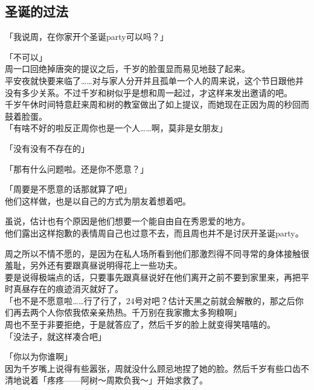 \subsection{圣诞的过法}

「我说周，在你家开个圣诞party可以吗？」

「不可以」\\

周一口回绝掉唐突的提议之后，千岁的脸蛋显而易见地鼓了起来。\\

平安夜就快要来临了……对与家人分开并且孤单一个人的周来说，这个节日跟他并没有多少关系。不过千岁和树似乎是想和周一起过，才这样来发出邀请的吧。\\

千岁午休时间特意赶来周和树的教室做出了如上提议，而她现在正因为周的秒回而鼓着脸蛋。\\

「有啥不好的啦反正周你也是一个人……啊，莫非是女朋友」

「没有没有不存在的」

「那有什么问题啦。还是你不愿意？」

「周要是不愿意的话那就算了吧」\\

他们这样做，也是以自己的方式为朋友着想着吧。

虽说，估计也有个原因是他们想要一个能自由自在秀恩爱的地方。\\

他们露出这样抱歉的表情周自己也过意不去，而且周也并不是讨厌开圣诞party。

周之所以不情不愿的，是因为在私人场所看到他们那激烈得不同寻常的身体接触很羞耻，另外还有要跟真昼说明得花上一些功夫。\\

要是说得极端点的话，只要事先跟真昼说好在他们离开之前不要到家里来，再把平时真昼存在的痕迹消灭就好了。\\

「也不是不愿意啦……行了行了，24号对吧？估计天黑之前就会解散的，那之后你们再去两个人你侬我侬亲亲热热。千万别在我家撒太多狗粮啊」\\

周也不至于非要拒绝，于是就答应了，然后千岁的脸上就变得笑嘻嘻的。\\

「没法子，就这样凑合吧」

「你以为你谁啊」\\

因为千岁嘴上说得有些嚣张，周就没什么顾忌地捏了她的脸。然后千岁有些口齿不清地说着「疼疼——阿树～周欺负我～」开始求救了。\\

